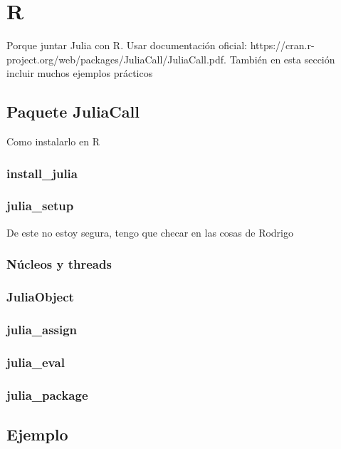 \chapter{R}
Porque juntar Julia con R. Usar documentación oficial: https://cran.r-project.org/web/packages/JuliaCall/JuliaCall.pdf. También en esta sección incluir muchos ejemplos prácticos 

\section{Paquete JuliaCall}
Como instalarlo en R 

\subsection{install\_julia}

\subsection{julia\_setup}
De este no estoy segura, tengo que checar en las cosas de Rodrigo

\subsection{Núcleos y threads}

\subsection{JuliaObject}

\subsection{julia\_assign}

\subsection{julia\_eval}

\subsection{julia\_package}

\section{Ejemplo}
